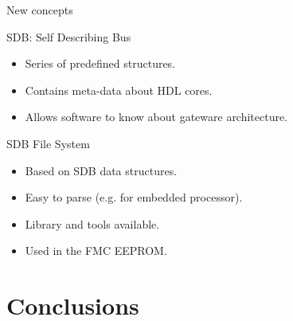 \documentclass[compress,red]{beamer}
\begin{document}
\begin{frame}{New concepts}

  \begin{block}{SDB: Self Describing Bus}
    \begin{itemize}
    \item Series of predefined structures.
    \item Contains meta-data about HDL cores.
    \item Allows software to know about gateware architecture.
    \end{itemize}
  \end{block}

  \begin{block}{SDB File System}
    \begin{itemize}
    \item Based on SDB data structures.
    \item Easy to parse (e.g. for embedded processor).
    \item Library and tools available. %
    \item Used in the FMC EEPROM.
    \end{itemize}
  \end{block}


\end{frame}



\section{Conclusions}

\subsection*{} %
\end{document}
